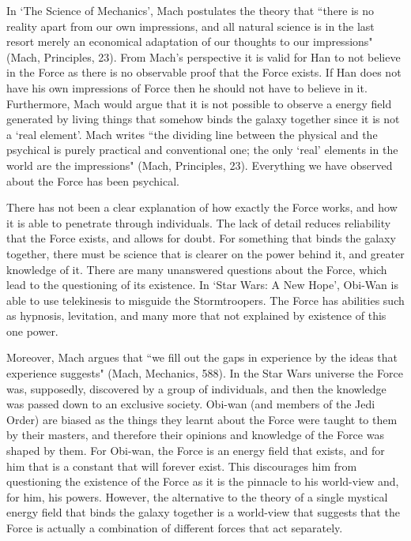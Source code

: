 \documentclass[11pt, oneside]{article}
\begin{document}
\par In `The Science of Mechanics', Mach postulates the theory that ``there is no reality apart from our own impressions, and all natural science is in the last resort merely an economical adaptation of our thoughts to our impressions" (Mach, Principles, 23). From Mach's perspective it is valid for Han to not believe in the Force as there is no observable proof that the Force exists. If Han does not have his own impressions of Force then he should not have to believe in it. Furthermore, Mach would argue that it is not possible to observe a energy field generated by living things that somehow binds the galaxy together since it is not a `real element'. Mach writes ``the dividing line between the physical and the psychical is purely practical and conventional one; the only `real' elements in the world are the impressions" (Mach, Principles, 23). Everything we have observed about the Force has been psychical.

\par There has not been a clear explanation of how exactly the Force works, and how it is able to penetrate through individuals. The lack of detail reduces reliability that the Force exists, and allows for doubt. For something that binds the galaxy together, there must be science that is clearer on the power behind it, and greater knowledge of it. There are many unanswered questions about the Force, which lead to the questioning of its existence. In `Star Wars: A New Hope', Obi-Wan is able to use telekinesis to misguide the Stormtroopers. The Force has abilities such as hypnosis, levitation, and many more that not explained by existence of this one power. 

\par Moreover, Mach argues that ``we fill out the gaps in experience by the ideas that experience suggests" (Mach, Mechanics, 588). In the Star Wars universe the Force was, supposedly, discovered by a group of individuals, and then the knowledge was passed down to an exclusive society. Obi-wan (and members of the Jedi Order) are biased as the things they learnt about the Force were taught to them by their masters, and therefore their opinions and knowledge of the Force was shaped by them. For Obi-wan, the Force is an energy field that exists, and for him that is a constant that will forever exist. This discourages him from questioning the existence of the Force as it is the pinnacle to his world-view and, for him, his powers. However, the alternative to the theory of a single mystical energy field that binds the galaxy together is a world-view that suggests that the Force is actually a combination of different forces that act separately.
\end{document}

